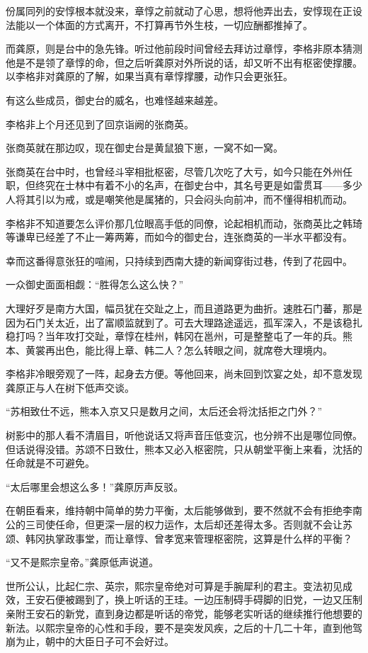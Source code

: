 份属同列的安惇根本就没来，章惇之前就动了心思，想将他弄出去，安惇现在正设法能以一个体面的方式离开，不打算再节外生枝，一切应酬都推掉了。

而龚原，则是台中的急先锋。听过他前段时间曾经去拜访过章惇，李格非原本猜测他是不是领了章惇的命，但之后听龚原对外所说的话，却又听不出有枢密使撑腰。以李格非对龚原的了解，如果当真有章惇撑腰，动作只会更张狂。

有这么些成员，御史台的威名，也难怪越来越差。

李格非上个月还见到了回京诣阙的张商英。

张商英就在那边叹，现在御史台是黄鼠狼下崽，一窝不如一窝。

张商英在台中时，也曾经斗宰相批枢密，尽管几次吃了大亏，如今只能在外州任职，但终究在士林中有着不小的名声，在御史台中，其名号更是如雷贯耳——多少人将其引以为戒，或是嘲笑他是属猪的，只会闷头向前冲，而不懂得相机而动。

李格非不知道要怎么评价那几位眼高手低的同僚，论起相机而动，张商英比之韩琦等谦卑已经差了不止一筹两筹，而如今的御史台，连张商英的一半水平都没有。

幸而这番得意张狂的喧闹，只持续到西南大捷的新闻穿街过巷，传到了花园中。

一众御史面面相觑：“胜得怎么这么快？”

大理好歹是南方大国，幅员犹在交趾之上，而且道路更为曲折。速胜石门蕃，那是因为石门关太近，出了富顺监就到了。可去大理路途遥远，孤军深入，不是该稳扎稳打吗？当年攻打交趾，章惇在桂州，韩冈在邕州，可是整整屯了一年的兵。熊本、黄裳再出色，能比得上章、韩二人？怎么转眼之间，就席卷大理境内。

李格非冷眼旁观了一阵，起身去方便。等他回来，尚未回到饮宴之处，却不意发现龚原正与人在树下低声交谈。

“苏相致仕不远，熊本入京又只是数月之间，太后还会将沈括拒之门外？”

树影中的那人看不清眉目，听他说话又将声音压低变沉，也分辨不出是哪位同僚。但话说得没错。苏颂不日致仕，熊本又必入枢密院，只从朝堂平衡上来看，沈括的任命就是不可避免。

“太后哪里会想这么多！”龚原厉声反驳。

在朝臣看来，维持朝中简单的势力平衡，太后能够做到，要不然就不会有拒绝李南公的三司使任命，但更深一层的权力运作，太后却还差得太多。否则就不会让苏颂、韩冈执掌政事堂，而让章惇、曾孝宽来管理枢密院，这算是什么样的平衡？

“又不是熙宗皇帝。”龚原低声说道。

世所公认，比起仁宗、英宗，熙宗皇帝绝对可算是手腕犀利的君主。变法初见成效，王安石便被踢到了，换上听话的王珪。一边压制碍手碍脚的旧党，一边又压制亲附王安石的新党，直到身边都是听话的帝党，能够老实听话的继续推行他想要的新法。以熙宗皇帝的心性和手段，要不是突发风疾，之后的十几二十年，直到他驾崩为止，朝中的大臣日子可不会好过。

